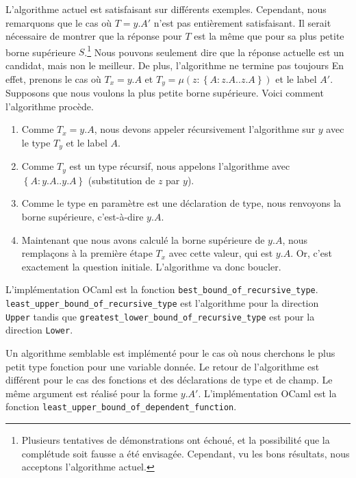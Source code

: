 
L'algorithme actuel est satisfaisant sur différents exemples. Cependant, nous
remarquons que le cas où $T = y.A'$ n'est pas entièrement satisfaisant. Il serait nécessaire de
montrer que la réponse pour $T$ est la même que pour sa plus petite borne
supérieure $S$.\footnote{Plusieurs
tentatives de démonstrations ont échoué, et la possibilité que la complétude soit
fausse a été envisagée.
Cependant, vu les bons résultats, nous acceptons l'algorithme actuel.} Nous
pouvons seulement dire que la réponse actuelle est un candidat, mais non le
meilleur.
De plus, l'algorithme ne termine pas toujours
En effet, prenons le cas où $T_{x} = y.A$ et $T_{y} = \mu(z : \left\{ A :
z.A .. z.A \right\})$ et le label $A'$. Supposons que nous voulons la plus
petite borne supérieure. Voici comment l'algorithme procède.
\begin{enumerate}
\item Comme $T_{x} = y.A$, nous devons appeler récursivement l'algorithme sur $y$
  avec le type $T_{y}$ et le label $A$.
\item Comme $T_{y}$ est un type récursif, nous appelons l'algorithme avec \\
  $\left\{ A : y.A .. y.A \right\}$ (substitution de $z$ par $y$).
\item Comme le type en paramètre est une déclaration de type, nous renvoyons la
  borne supérieure, c'est-à-dire $y.A$.
\item Maintenant que nous avons calculé la borne supérieure de $y.A$, nous
  remplaçons à la première étape $T_{x}$ avec cette valeur, qui est $y.A$. Or,
  c'est exactement la question initiale. L'algorithme va donc boucler.
\end{enumerate}

L'implémentation OCaml est la fonction \verb|best_bound_of_recursive_type|.
\verb|least_upper_bound_of_recursive_type| est l'algorithme pour la direction \\
\verb|Upper| tandis que \verb|greatest_lower_bound_of_recursive_type| est pour
la direction \verb|Lower|.

Un algorithme semblable est implémenté pour le cas où nous cherchons le plus
petit type fonction pour une variable donnée. Le retour de l'algorithme est
différent pour le cas des fonctions et des déclarations de type et de champ. Le
même argument est réalisé pour la forme $y.A'$.
L'implémentation OCaml est la fonction \verb|least_upper_bound_of_dependent_function|.

